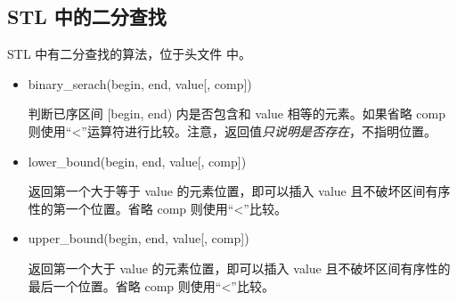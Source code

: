\subsection{STL 中的二分查找}
	STL 中有二分查找的算法，位于头文件  中。

	\begin{itemize}
		\item binary\_{}serach(begin, end, value[, comp])
			
			判断已序区间 [begin, end) 内是否包含和 value 相等的元素。如果省略 comp 则使用“<”运算符进行比较。注意，返回值\emph{只说明是否存在}，不指明位置。
		
		\item lower\_{}bound(begin, end, value[, comp])
		
			返回第一个大于等于 value 的元素位置，即可以插入 value 且不破坏区间有序性的第一个位置。省略 comp 则使用“<”比较。
			
		\item upper\_{}bound(begin, end, value[, comp])
		
			返回第一个大于 value 的元素位置，即可以插入 value 且不破坏区间有序性的最后一个位置。省略 comp 则使用“<”比较。
	\end{itemize}
